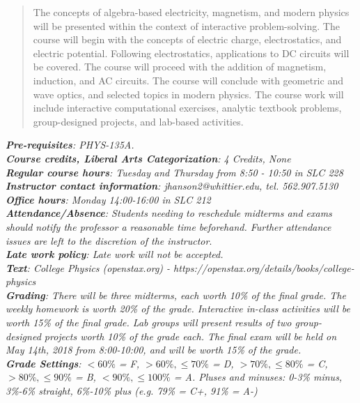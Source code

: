 \documentclass[10pt]{article}
\begin{document}
\maketitle

\begin{abstract}
The concepts of algebra-based electricity, magnetism, and modern physics will be presented within the context of interactive problem-solving.  The course will begin with the concepts of electric charge, electrostatics, and electric potential.  Following electrostatics, applications to DC circuits will be covered.  The course will proceed with the addition of magnetism, induction, and AC circuits.  The course will conclude with geometric and wave optics, and selected topics in modern physics.  The course work will include interactive computational exercises, analytic textbook problems, group-designed projects, and lab-based activities.
\end{abstract}
\noindent
\textit{\textbf{Pre-requisites}: PHYS-135A.} \\
\textit{\textbf{Course credits, Liberal Arts Categorization}: 4 Credits, None} \\
\textit{\textbf{Regular course hours}: Tuesday and Thursday from 8:50 - 10:50 in SLC 228} \\
\textit{\textbf{Instructor contact information}: jhanson2@whittier.edu, tel. 562.907.5130} \\
\textit{\textbf{Office hours}: Monday 14:00-16:00 in SLC 212} \\
\textit{\textbf{Attendance/Absence}: Students needing to reschedule midterms and exams should notify the professor a reasonable time beforehand. Further attendance issues are left to the discretion of the instructor}.\\ 
\textit{\textbf{Late work policy}: Late work will not be accepted.} \\
\textit{\textbf{Text}: College Physics (openstax.org) -  https://openstax.org/details/books/college-physics} \\
\textit{\textbf{Grading}: There will be three midterms, each worth 10\% of the final grade.  The weekly homework is worth 20\% of the grade.  Interactive in-class activities will be worth 15\% of the final grade.  Lab groups will present results of two group-designed projects worth 10\% of the grade each.  The final exam will be held on May 14th, 2018 from 8:00-10:00, and will be worth 15\% of the grade.} \\
\textit{\textbf{Grade Settings}: $<60\%$ = F, $>60\%,\leq 70\%$ = D, $>70\%,\leq80\%$ = C, $>80\%,\leq 90\%$ = B, $<90\%,\leq 100\%$ = A.  Pluses and minuses: 0-3\% minus, 3\%-6\% straight, 6\%-10\% plus (e.g. 79\% = C+, 91\% = A-)} \\
\end{document}
